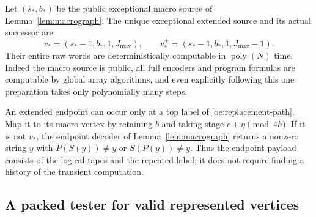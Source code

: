 Let $(s_*,b_*)$ be the public exceptional macro source of
Lemma~\ref{lem:macrograph}. The unique exceptional extended source and
its actual successor are
\begin{equation}\label{oe:public-source}
 v_*=(s_*-1,b_*,1,J_{\max}),\qquad
 v_*^+=(s_*-1,b_*,1,J_{\max}-1).
\end{equation}
Their entire raw words are deterministically computable in
$\operatorname{poly}(N)$ time. Indeed the macro source is public, all
full encoders and program formulas are computable by global array
algorithms, and even explicitly following this one preparation takes
only polynomially many steps.

An extended endpoint can occur only at a top label of
\eqref{oe:replacement-path}. Map it to its macro vertex by retaining $b$
and taking stage $c+\eta\pmod{4h}$. If it is not $v_*$, the endpoint
decoder of Lemma~\ref{lem:macrograph} returns a nonzero string $y$ with
$P(S(y))\ne y$ or $S(P(y))\ne y$. Thus the endpoint payload consists of
the logical tapes and the repeated label; it does not require finding a
history of the transient computation.

\subsection{A packed tester for valid represented vertices}


